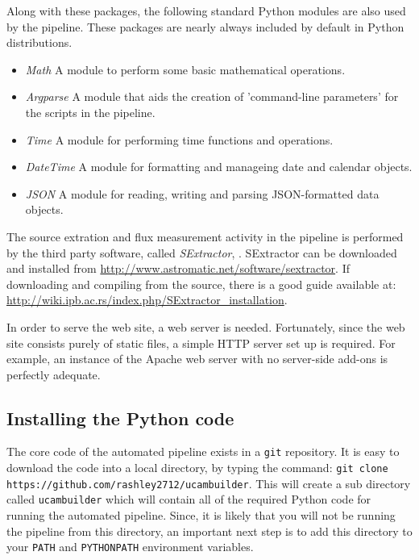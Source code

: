 Along with these packages, the following standard Python modules are also used by the pipeline. These packages are nearly always included by default in Python distributions.
\begin{itemize}
  \item \emph{Math} A module to perform some basic mathematical operations.
  \item \emph{Argparse} A module that aids the creation of 'command-line parameters' for the scripts in the pipeline. 
  \item \emph{Time} A module for performing time functions and operations.
  \item \emph{DateTime} A module for formatting and manageing date and calendar objects.
  \item \emph{JSON} A module for reading, writing and parsing JSON-formatted data objects. 
\end{itemize}

The source extration and flux measurement activity in the pipeline is performed by the third party software, called \emph{SExtractor}, \cite{bertin}. SExtractor can be downloaded and installed from \url{http://www.astromatic.net/software/sextractor}. If downloading and compiling from the source, there is a good guide available at: \url{http://wiki.ipb.ac.rs/index.php/SExtractor_installation}. 

In order to serve the web site, a web server is needed. Fortunately, since the web site consists purely of static files, a simple HTTP server set up is required. For example, an instance of the Apache web server with no server-side add-ons is perfectly adequate. 

\subsection{Installing the Python code}
The core code of the automated pipeline exists in a \texttt{git} repository. It is easy to download the code into a local directory, by typing the command: \texttt{git clone https://github.com/rashley2712/ucambuilder}.  This will create a sub directory called \texttt{ucambuilder} which will contain all of the required Python code for running the automated pipeline. Since, it is likely that you will not be running the pipeline from this directory, an important next step is to add this directory to your \texttt{PATH} and \texttt{PYTHONPATH} environment variables. 

